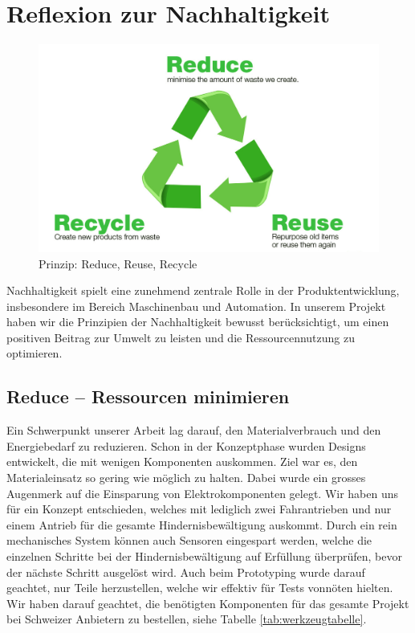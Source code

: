 \documentclass[../main.tex]{subfiles}
\begin{document}
\newpage
\section{Reflexion zur Nachhaltigkeit}

\begin{figure}[H] %
    \centering
        \includegraphics[width=0.7\linewidth]{img/nachhaltigkeit/3R-reduce-reuse-recycle.jpg}
        \caption[Prinzip: Reduce, Reuse, Recycle]{Prinzip: Reduce, Reuse, Recycle \footnotemark}
        
        \label{fig:3R}
    \end{figure} 


Nachhaltigkeit spielt eine zunehmend zentrale Rolle in der Produktentwicklung, insbesondere im Bereich Maschinenbau und Automation. In unserem Projekt haben wir die Prinzipien der Nachhaltigkeit bewusst berücksichtigt, um einen positiven Beitrag zur Umwelt zu leisten und die Ressourcennutzung zu optimieren.

\subsection{Reduce – Ressourcen minimieren}

Ein Schwerpunkt unserer Arbeit lag darauf, den Materialverbrauch und den Energiebedarf zu reduzieren. Schon in der Konzeptphase wurden Designs entwickelt, die mit wenigen Komponenten auskommen. Ziel war es, den Materialeinsatz so gering wie möglich zu halten. Dabei wurde ein grosses Augenmerk auf die Einsparung von Elektrokomponenten gelegt. Wir haben uns für ein Konzept entschieden, welches mit lediglich zwei Fahrantrieben und nur einem Antrieb für die gesamte Hindernisbewältigung auskommt. Durch ein rein mechanisches System können auch Sensoren eingespart werden, welche die einzelnen Schritte bei der Hindernisbewältigung auf Erfüllung überprüfen, bevor der nächste Schritt ausgelöst wird. Auch beim Prototyping wurde darauf geachtet, nur Teile herzustellen, welche wir effektiv für Tests vonnöten hielten. Wir haben darauf geachtet, die benötigten Komponenten für das gesamte Projekt bei Schweizer Anbietern zu bestellen, siehe Tabelle \ref{tab:werkzeugtabelle}.
\end{document}
